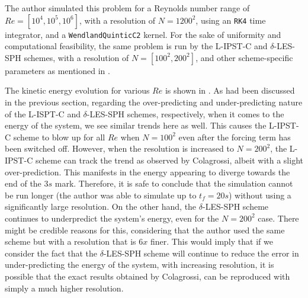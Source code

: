The author simulated this problem for a Reynolds number range of $Re = [10^4, 10^5, 10^6]$, with a resolution of $N=1200^2$, using an \texttt{RK4} time integrator, and a \texttt{WendlandQuinticC2} kernel.
For the sake of uniformity and computational feasibility, the same problem is run by the L-IPST-C and $\delta$-LES-SPH schemes, with a resolution of $N=[100^2, 200^2]$, and other scheme-specific parameters as mentioned in .

The kinetic energy evolution for various $Re$ is shown in .
As had been discussed in the previous section, regarding the over-predicting and under-predicting nature of the L-ISPT-C and $\delta$-LES-SPH schemes, respectively, when it comes to the energy of the system, we see similar trends here as well.
This causes the L-IPST-C scheme to blow up for all $Re$ when $N=100^2$ even after the forcing term has been switched off. 
However, when the resolution is increased to $N=200^2$, the L-IPST-C scheme can track the trend as observed by Colagrossi, albeit with a slight over-prediction. This manifests in the energy appearing to diverge towards the end of the $3s$ mark. Therefore, it is safe to conclude that the simulation cannot be run longer (the author was able to simulate up to $t_f=20s$) without using a significantly large resolution.
On the other hand, the $\delta$-LES-SPH scheme continues to underpredict the system's energy, even for the $N=200^2$ case. There might be credible reasons for this, considering that the author used the same scheme but with a resolution that is $6x$ finer. This would imply that if we consider the fact that the $\delta$-LES-SPH scheme will continue to reduce the error in under-predicting the energy of the system, with increasing resolution, it is possible that the exact results obtained by Colagrossi, can be reproduced with simply a much higher resolution.

